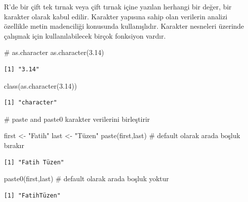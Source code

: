 \documentclass[
  letterpaper,
  DIV=11,
  numbers=noendperiod]{scrreprt}
\newenvironment{Shaded}{\begin{snugshade}}{\end{snugshade}}
\newcommand{\CommentTok}[1]{\textcolor[rgb]{0.37,0.37,0.37}{#1}}
\newcommand{\FloatTok}[1]{\textcolor[rgb]{0.68,0.00,0.00}{#1}}
\newcommand{\FunctionTok}[1]{\textcolor[rgb]{0.28,0.35,0.67}{#1}}
\newcommand{\NormalTok}[1]{\textcolor[rgb]{0.00,0.23,0.31}{#1}}
\newcommand{\OtherTok}[1]{\textcolor[rgb]{0.00,0.23,0.31}{#1}}
\newcommand{\StringTok}[1]{\textcolor[rgb]{0.13,0.47,0.30}{#1}}
\begin{document}
R'de bir çift tek tırnak veya çift tırnak içine yazılan herhangi bir
değer, bir karakter olarak kabul edilir. Karakter yapısına sahip olan
verilerin analizi özellikle metin madenciliği konusunda kullanışlıdır.
Karakter nesneleri üzerinde çalışmak için kullanılabilecek birçok
fonksiyon vardır.

\begin{Shaded}
\begin{Highlighting}[]
\CommentTok{\# as.character}
\FunctionTok{as.character}\NormalTok{(}\FloatTok{3.14}\NormalTok{)}
\end{Highlighting}
\end{Shaded}

\begin{verbatim}
[1] "3.14"
\end{verbatim}

\begin{Shaded}
\begin{Highlighting}[]
\FunctionTok{class}\NormalTok{(}\FunctionTok{as.character}\NormalTok{(}\FloatTok{3.14}\NormalTok{))}
\end{Highlighting}
\end{Shaded}

\begin{verbatim}
[1] "character"
\end{verbatim}

\begin{Shaded}
\begin{Highlighting}[]
\CommentTok{\# paste and paste0 karakter verilerini birleştirir}

\NormalTok{first }\OtherTok{\textless{}{-}} \StringTok{"Fatih"}
\NormalTok{last }\OtherTok{\textless{}{-}} \StringTok{"Tüzen"}
\FunctionTok{paste}\NormalTok{(first,last) }\CommentTok{\# default olarak arada boşluk bırakır}
\end{Highlighting}
\end{Shaded}

\begin{verbatim}
[1] "Fatih Tüzen"
\end{verbatim}

\begin{Shaded}
\begin{Highlighting}[]
\FunctionTok{paste0}\NormalTok{(first,last) }\CommentTok{\# default olarak arada boşluk yoktur}
\end{Highlighting}
\end{Shaded}

\begin{verbatim}
[1] "FatihTüzen"
\end{verbatim}
\end{document}
